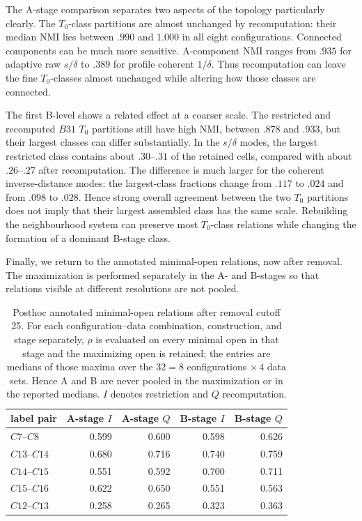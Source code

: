 \documentclass[a4paper,11pt]{article}
\theoremstyle{definition}
\theoremstyle{remark}
\begin{document}
The A-stage comparison separates two aspects of the topology particularly clearly. The $T_0$-class partitions are almost unchanged by recomputation: their median NMI lies between $.990$ and $1.000$ in all eight configurations. Connected components can be much more sensitive. A-component NMI ranges from $.935$ for adaptive raw $s/\delta$ to $.389$ for profile coherent $1/\delta$. Thus recomputation can leave the fine $T_0$-classes almost unchanged while altering how those classes are connected.

The first B-level shows a related effect at a coarser scale. The restricted and recomputed $B31$ $T_0$ partitions still have high NMI, between $.878$ and $.933$, but their largest classes can differ substantially. In the $s/\delta$ modes, the largest restricted class contains about $.30$–$.31$ of the retained cells, compared with about $.26$–$.27$ after recomputation. The difference is much larger for the coherent inverse-distance modes: the largest-class fractions change from $.117$ to $.024$ and from $.098$ to $.028$. Hence strong overall agreement between the two $T_0$ partitions does not imply that their largest assembled class has the same scale. Rebuilding the neighbourhood system can preserve most $T_0$-class relations while changing the formation of a dominant B-stage class.

Finally, we return to the annotated minimal-open relations, now after removal. The maximization is performed separately in the A- and B-stages so that relations visible at different resolutions are not pooled.

\begin{table}[!ht]
\centering
\small
\caption{Posthoc annotated minimal-open relations after removal cutoff 25. For each configuration--data combination, construction, and stage separately, $\rho$ is evaluated on every minimal open in that stage and the maximizing open is retained; the entries are medians of those maxima over the $32=8$ configurations $\times\,4$ data sets. Hence A and B are never pooled in the maximization or in the reported medians. $I$ denotes restriction and $Q$ recomputation.}
\label{tab:paul15-relations-after-removal}
\setlength{\tabcolsep}{4.5pt}
\begin{tabular}{@{}lrrrr@{}}
\toprule
label pair & A-stage $I$ & A-stage $Q$ & B-stage $I$ & B-stage $Q$ \\
\midrule
$C7$--$C8$ & 0.599 & 0.600 & 0.598 & 0.626 \\
$C13$--$C14$ & 0.680 & 0.716 & 0.740 & 0.759 \\
$C14$--$C15$ & 0.551 & 0.592 & 0.700 & 0.711 \\
$C15$--$C16$ & 0.622 & 0.650 & 0.551 & 0.563 \\
$C12$--$C13$ & 0.258 & 0.265 & 0.323 & 0.363 \\
\bottomrule
\end{tabular}
\end{table}
\end{document}
